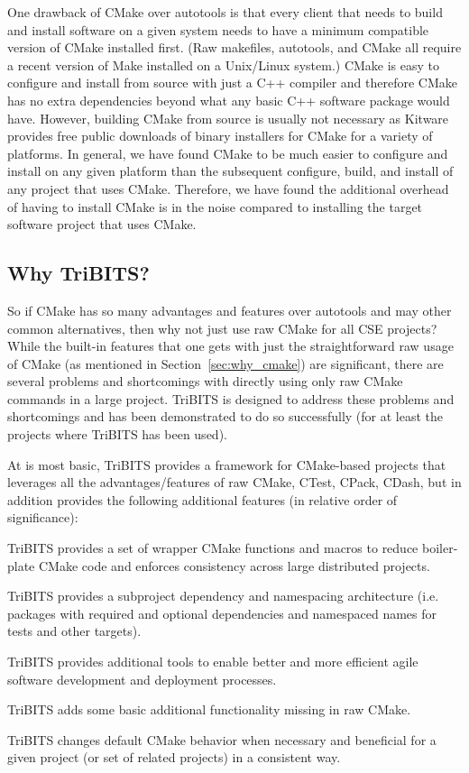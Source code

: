\documentclass[note]{TechNote}
\begin{document}
One drawback of CMake over autotools is that every client that needs to build and install software on a given system needs to have a minimum compatible version of CMake installed first.  (Raw makefiles, autotools, and CMake all require a recent version of Make installed on a Unix/Linux system.)  CMake is easy to configure and install from source with just a C++ compiler and therefore CMake has no extra dependencies beyond what any basic C++ software package would have.  However, building CMake from source is usually not necessary as Kitware provides free public downloads of binary installers for CMake for a variety of platforms.  In general, we have found CMake to be much easier to configure and install on any given platform than the subsequent configure, build, and install of any project that uses CMake.  Therefore, we have found the additional overhead of having to install CMake is in the noise compared to installing the target software project that uses CMake.

%
\subsection{Why TriBITS?}
\label{sec:why_tribits}
%

So if CMake has so many advantages and features over autotools and may other common alternatives, then why not just use raw CMake for all CSE projects?  While the built-in features that one gets with just the straightforward raw usage of CMake (as mentioned in Section~\ref{sec:why_cmake}) are significant, there are several problems and shortcomings with directly using only raw CMake commands in a large project.  TriBITS is designed to address these problems and shortcomings and has been demonstrated to do so successfully (for at least the projects where TriBITS has been used).

At is most basic, TriBITS provides a framework for CMake-based projects that leverages all the advantages/features of raw CMake, CTest, CPack, CDash, but in addition provides the following additional features (in relative order of significance):

\begin{compactitem}
\item TriBITS provides a set of wrapper CMake functions and macros to reduce boiler-plate CMake code and enforces consistency across large distributed projects.
\item TriBITS provides a subproject dependency and namespacing architecture (i.e. packages with required and optional dependencies and namespaced names for tests and other targets).
\item TriBITS provides additional tools to enable better and more efficient agile software development and deployment processes.
\item TriBITS adds some basic additional functionality missing in raw CMake.
\item TriBITS changes default CMake behavior when necessary and beneficial for a given project (or set of related projects) in a consistent way.
\end{compactitem}
\end{document}
